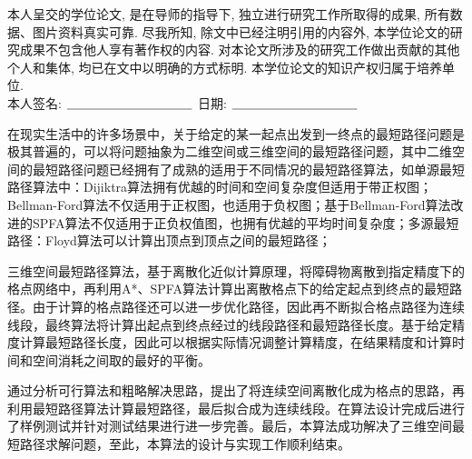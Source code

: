 {%

本人呈交的学位论文, 是在导师的指导下, 独立进行研究工作所取得的成果,
所有数据、图片资料真实可靠. 尽我所知, 除文中已经注明引用的内容外,
本学位论文的研究成果不包含他人享有著作权的内容.
对本论文所涉及的研究工作做出贡献的其他个人和集体,
均已在文中以明确的方式标明. 本学位论文的知识产权归属于培养单位.\\[2cm]

\hspace*{1cm}本人签名: $\underline{\hspace{3.5cm}}$
\hspace{2cm}日期: $\underline{\hspace{3.5cm}}$\hfill\par}
\baselineskip=23pt  %





\begin{cnabstract}
\par 在现实生活中的许多场景中，关于给定的某一起点出发到一终点的最短路径问题是极其普遍的，可以将问题抽象为二维空间或三维空间的最短路径问题，其中二维空间的最短路径问题已经拥有了成熟的适用于不同情况的最短路径算法，如单源最短路径算法中：Dijiktra算法拥有优越的时间和空间复杂度但适用于带正权图；Bellman-Ford算法不仅适用于正权图，也适用于负权图；基于Bellman-Ford算法改进的SPFA算法不仅适用于正负权值图，也拥有优越的平均时间复杂度；多源最短路径：Floyd算法可以计算出顶点到顶点之间的最短路径；
\par 三维空间最短路径算法，基于离散化近似计算原理，将障碍物离散到指定精度下的格点网络中，再利用A*、SPFA算法计算出离散格点下的给定起点到终点的最短路径。由于计算的格点路径还可以进一步优化路径，因此再不断拟合格点路径为连续线段，最终算法将计算出起点到终点经过的线段路径和最短路径长度。基于给定精度计算最短路径长度，因此可以根据实际情况调整计算精度，在结果精度和计算时间和空间消耗之间取的最好的平衡。
\par 通过分析可行算法和粗略解决思路，提出了将连续空间离散化成为格点的思路，再利用最短路径算法计算最短路径，最后拟合成为连续线段。在算法设计完成后进行了样例测试并针对测试结果进行进一步完善。最后，本算法成功解决了三维空间最短路径求解问题，至此，本算法的设计与实现工作顺利结束。


\end{cnabstract}
\par
\vspace*{2em}


